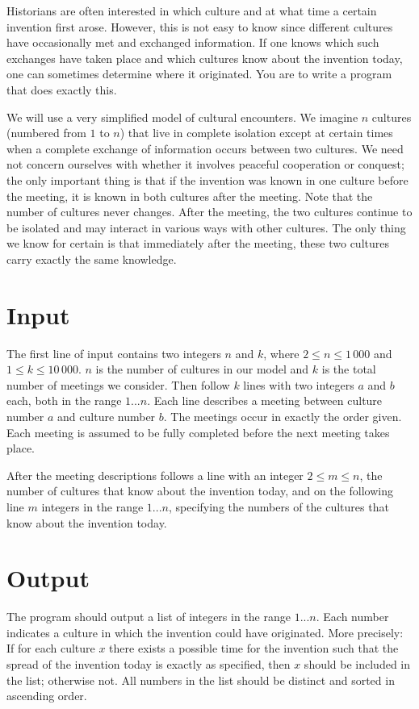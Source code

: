 
Historians are often interested in which culture and at what time a certain invention first arose. However, this is not easy to know since different cultures have occasionally met and exchanged information. If one knows which such exchanges have taken place and which cultures know about the invention today, one can sometimes determine where it originated. You are to write a program that does exactly this.

We will use a very simplified model of cultural encounters. We imagine $n$ cultures (numbered from $1$ to $n$) that live in complete isolation except at certain times when a complete exchange of information occurs between two cultures. We need not concern ourselves with whether it involves peaceful cooperation or conquest; the only important thing is that if the invention was known in one culture before the meeting, it is known in both cultures after the meeting. Note that the number of cultures never changes. After the meeting, the two cultures continue to be isolated and may interact in various ways with other cultures. The only thing we know for certain is that immediately after the meeting, these two cultures carry exactly the same knowledge.

\section*{Input}
The first line of input contains two integers $n$ and $k$, where $2 \le n \le 1\,000$ and $1 \le k \le 10\,000$. $n$ is the number of cultures in our model and $k$ is the total number of meetings we consider. Then follow $k$ lines with two integers $a$ and $b$ each, both in the range $1...n$. Each line describes a meeting between culture number $a$ and culture number $b$. The meetings occur in exactly the order given. Each meeting is assumed to be fully completed before the next meeting takes place.

After the meeting descriptions follows a line with an integer $2 \le m \le n$, the number of cultures that know about the invention today, and on the following line $m$ integers in the range $1...n$, specifying the numbers of the cultures that know about the invention today.

\section*{Output}
The program should output a list of integers in the range $1...n$. Each number indicates a culture in which the invention could have originated. More precisely: If for each culture $x$ there exists a possible time for the invention such that the spread of the invention today is exactly as specified, then $x$ should be included in the list; otherwise not. All numbers in the list should be distinct and sorted in ascending order.
